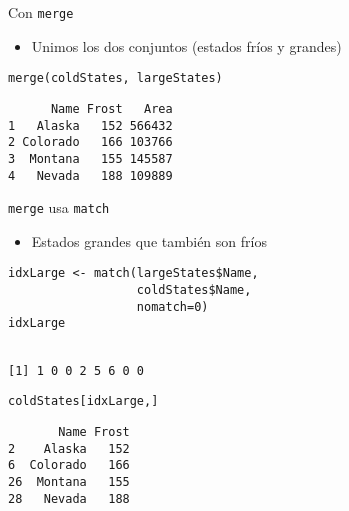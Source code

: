 \documentclass[xcolor={usenames,svgnames,dvipsnames}]{beamer}
\begin{document}
\begin{frame}[label={sec:org11211cb},fragile]{Con \texttt{merge}}
 \begin{itemize}
\item Unimos los dos conjuntos (estados \guillemotleft{}fríos\guillemotright{} y \guillemotleft{}grandes\guillemotright{})
\end{itemize}
\lstset{language=r,label= ,caption= ,captionpos=b,numbers=none}
\begin{lstlisting}
merge(coldStates, largeStates)
\end{lstlisting}

\begin{verbatim}
      Name Frost   Area
1   Alaska   152 566432
2 Colorado   166 103766
3  Montana   155 145587
4   Nevada   188 109889
\end{verbatim}
\end{frame}

\begin{frame}[label={sec:org4eae806},fragile]{\texttt{merge} usa \texttt{match}}
 \begin{itemize}
\item Estados grandes que también son fríos
\end{itemize}
\lstset{language=r,label= ,caption= ,captionpos=b,numbers=none}
\begin{lstlisting}
idxLarge <- match(largeStates$Name,
                  coldStates$Name,
                  nomatch=0)
idxLarge
\end{lstlisting}

\begin{verbatim}

[1] 1 0 0 2 5 6 0 0
\end{verbatim}


\lstset{language=r,label= ,caption= ,captionpos=b,numbers=none}
\begin{lstlisting}
coldStates[idxLarge,]
\end{lstlisting}

\begin{verbatim}
       Name Frost
2    Alaska   152
6  Colorado   166
26  Montana   155
28   Nevada   188
\end{verbatim}
\end{frame}
\end{document}
